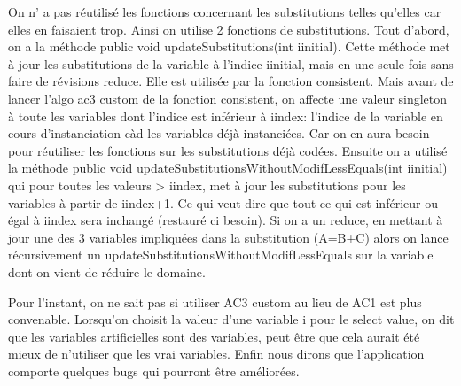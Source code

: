 
On n’ a pas réutilisé les fonctions concernant les substitutions telles qu'elles car elles en faisaient trop. Ainsi on utilise 2 fonctions de substitutions.
Tout d'abord, on a la méthode public void updateSubstitutions(int iinitial).
Cette méthode met à jour les substitutions de la variable à l'indice iinitial, mais en une seule fois sans faire de révisions reduce. Elle est utilisée par la fonction consistent.
Mais avant de lancer l'algo ac3 custom de la fonction consistent, on affecte une valeur singleton à toute les variables dont l'indice est inférieur à iindex: l'indice de la variable en cours d'instanciation càd les variables déjà instanciées.
Car on en aura besoin pour réutiliser les fonctions sur les substitutions déjà codées.
Ensuite on a utilisé la méthode
 public void updateSubstitutionsWithoutModifLessEquals(int iinitial) qui pour toutes les valeurs > iindex, met à jour les substitutions pour les variables à partir de iindex+1. Ce qui veut dire que tout ce qui est inférieur ou égal à iindex sera inchangé (restauré ci besoin).
Si on a un reduce, en mettant à jour une des 3 variables impliquées dans la substitution (A=B+C) alors on lance récursivement un
updateSubstitutionsWithoutModifLessEquals sur la variable dont on vient de réduire le domaine.

      
Pour l’instant, on ne sait pas si utiliser AC3 custom au lieu de  AC1 est plus convenable.
Lorsqu'on choisit la valeur d'une variable i pour le select value, on dit que les variables artificielles sont des variables, peut être que cela aurait été mieux de n'utiliser que les vrai variables. 
Enfin nous dirons que l’application comporte quelques  bugs qui pourront être améliorées.
